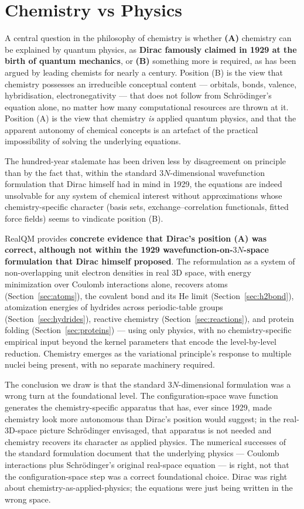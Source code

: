 \documentclass[11pt]{article}
\begin{document}
\section{Chemistry vs Physics}\label{sec:chemvphys}

A central question in the philosophy of chemistry is whether \textbf{(A)} chemistry can be explained by quantum physics, as \textbf{Dirac famously claimed in 1929 at the birth of quantum mechanics}, or \textbf{(B)} something more is required, as has been argued by leading chemists for nearly a century. Position (B) is the view that chemistry possesses an irreducible conceptual content --- orbitals, bonds, valence, hybridisation, electronegativity --- that does not follow from Schr\"odinger's equation alone, no matter how many computational resources are thrown at it. Position (A) is the view that chemistry \emph{is} applied quantum physics, and that the apparent autonomy of chemical concepts is an artefact of the practical impossibility of solving the underlying equations.

The hundred-year stalemate has been driven less by disagreement on principle than by the fact that, within the standard $3N$-dimensional wavefunction formulation that Dirac himself had in mind in 1929, the equations are indeed unsolvable for any system of chemical interest without approximations whose chemistry-specific character (basis sets, exchange--correlation functionals, fitted force fields) seems to vindicate position (B).

RealQM provides \textbf{concrete evidence that Dirac's position (A) was correct, although not within the 1929 wavefunction-on-$3N$-space formulation that Dirac himself proposed}. The reformulation as a system of non-overlapping unit electron densities in real 3D space, with energy minimization over Coulomb interactions alone, recovers atoms (Section~\ref{sec:atoms}), the covalent bond and its He limit (Section~\ref{sec:h2bond}), atomization energies of hydrides across periodic-table groups (Section~\ref{sec:hydrides}), reactive chemistry (Section~\ref{sec:reactions}), and protein folding (Section~\ref{sec:proteins}) --- using only physics, with no chemistry-specific empirical input beyond the kernel parameters that encode the level-by-level reduction. Chemistry emerges as the variational principle's response to multiple nuclei being present, with no separate machinery required.

The conclusion we draw is that the standard $3N$-dimensional formulation was a wrong turn at the foundational level. The configuration-space wave function generates the chemistry-specific apparatus that has, ever since 1929, made chemistry look more autonomous than Dirac's position would suggest; in the real-3D-space picture Schr\"odinger envisaged, that apparatus is not needed and chemistry recovers its character as applied physics. The numerical successes of the standard formulation document that the underlying physics --- Coulomb interactions plus Schr\"odinger's original real-space equation --- is right, not that the configuration-space step was a correct foundational choice. Dirac was right about chemistry-as-applied-physics; the equations were just being written in the wrong space.
\end{document}
